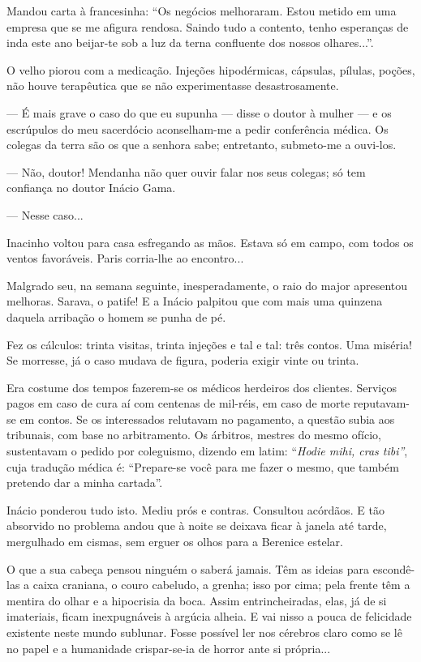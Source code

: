 Mandou carta à francesinha: ``Os negócios melhoraram. Estou metido em
uma empresa que se me afigura rendosa. Saindo tudo a contento, tenho
esperanças de inda este ano beijar-te sob a luz da terna confluente dos
nossos olhares...''.

O velho piorou com a medicação. Injeções hipodérmicas, cápsulas,
pílulas, poções, não houve terapêutica que se não experimentasse
desastrosamente.

--- É mais grave o caso do que eu supunha --- disse o doutor à mulher
--- e os escrúpulos do meu sacerdócio aconselham-me a pedir conferência
médica. Os colegas da terra são os que a senhora sabe; entretanto,
submeto-me a ouvi-los.

--- Não, doutor! Mendanha não quer ouvir falar nos seus colegas; só tem
confiança no doutor Inácio Gama.

--- Nesse caso...

Inacinho voltou para casa esfregando as mãos. Estava só em campo, com
todos os ventos favoráveis. Paris corria-lhe ao encontro...

Malgrado seu, na semana seguinte, inesperadamente, o raio do major
apresentou melhoras. Sarava, o patife! E a Inácio palpitou que com mais
uma quinzena daquela arribação o homem se punha de pé.

Fez os cálculos: trinta visitas, trinta injeções e tal e tal: três
contos. Uma miséria! Se morresse, já o caso mudava de figura, poderia
exigir vinte ou trinta.

Era costume dos tempos fazerem-se os médicos herdeiros dos clientes.
Serviços pagos em caso de cura aí com centenas de mil-réis, em caso de
morte reputavam-se em contos. Se os interessados relutavam no pagamento,
a questão subia aos tribunais, com base no arbitramento. Os árbitros,
mestres do mesmo ofício, sustentavam o pedido por coleguismo, dizendo em
latim: ``\emph{Hodie mihi, cras tibi''}, cuja tradução médica é:
``Prepare-se você para me fazer o mesmo, que também pretendo dar a minha
cartada''.

Inácio ponderou tudo isto. Mediu prós e contras. Consultou acórdãos. E
tão absorvido no problema andou que à noite se deixava ficar à janela
até tarde, mergulhado em cismas, sem erguer os olhos para a Berenice
estelar.

O que a sua cabeça pensou ninguém o saberá jamais. Têm as ideias para
escondê-las a caixa craniana, o couro cabeludo, a grenha; isso por cima;
pela frente têm a mentira do olhar e a hipocrisia da boca. Assim
entrincheiradas, elas, já de si imateriais, ficam inexpugnáveis à
argúcia alheia. E vai nisso a pouca de felicidade existente neste mundo
sublunar. Fosse possível ler nos cérebros claro como se lê no papel e a
humanidade crispar-se-ia de horror ante si própria...

